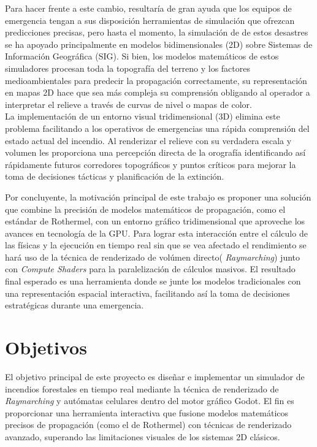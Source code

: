Para hacer frente a este cambio, resultaría de gran ayuda que los equipos de emergencia tengan a sus disposición herramientas de simulación que ofrezcan predicciones precisas, pero hasta el momento, la simulación de de estos desastres se ha apoyado principalmente en modelos bidimensionales (2D) sobre Sistemas de Información Geográfica (SIG). Si bien, los modelos matemáticos de estos simuladores procesan toda la topografía del terreno y los factores medioambientales para predecir la propagación correctamente, su representación en mapas 2D hace que sea más compleja su comprensión obligando al  operador a interpretar el relieve a través de curvas de nivel o mapas de color.\\ 

La implementación de un entorno visual tridimensional (3D) elimina este problema facilitando a los operativos de emergencias una rápida comprensión del estado actual del incendio. Al renderizar el relieve con su verdadera escala y volumen les proporciona una percepción directa de la orografía identificando así rápidamente futuros  corredores topográficos y puntos críticos para mejorar la toma de decisiones tácticas y planificación de la extinción.\\

\newpage

Por concluyente, la motivación principal de este trabajo es proponer una solución que combine la precisión de modelos matemáticos de propagación, como el estándar de Rothermel, con un entorno gráfico tridimensional que aproveche los avances en tecnología de la GPU. Para lograr esta interacción entre el cálculo de las físicas y la ejecución en tiempo real sin que se vea afectado el rendimiento se hará uso de la técnica de renderizado de volúmen directo( \textit{Raymarching}) junto con \textit{Compute Shaders} para la paralelización de cálculos masivos. El resultado final esperado es una herramienta donde se junte los modelos tradicionales con una representación espacial interactiva, facilitando así la toma de decisiones estratégicas durante una emergencia.\\ 

\clearpage
\section{Objetivos}
El objetivo principal de este proyecto es diseñar e implementar un simulador de incendios forestales en tiempo real mediante la técnica de renderizado de \textit{Raymarching} y autómatas celulares dentro del motor gráfico Godot. El fin es proporcionar una herramienta interactiva que fusione modelos matemáticos precisos de propagación (como el de Rothermel) con técnicas de renderizado avanzado, superando las limitaciones visuales de los sistemas 2D clásicos.\\

